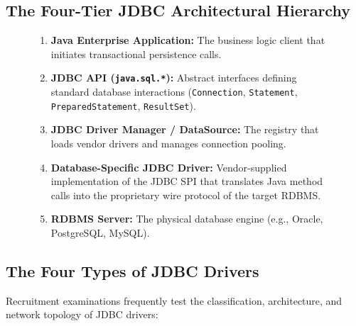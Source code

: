 \subsection{The Four-Tier JDBC Architectural Hierarchy}
\begin{figure}[htbp]
\centering
\begin{tcolorbox}[colback=codebg, colframe=primary, title=\textbf{The Canonical JDBC Component Hierarchy}]
\begin{enumerate}
    \item \textbf{Java Enterprise Application:} The business logic client that initiates transactional persistence calls.
    \item \textbf{JDBC API (\texttt{java.sql.*}):} Abstract interfaces defining standard database interactions (\texttt{Connection}, \texttt{Statement}, \texttt{PreparedStatement}, \texttt{ResultSet}).
    \item \textbf{JDBC Driver Manager / DataSource:} The registry that loads vendor drivers and manages connection pooling.
    \item \textbf{Database-Specific JDBC Driver:} Vendor-supplied implementation of the JDBC SPI that translates Java method calls into the proprietary wire protocol of the target RDBMS.
    \item \textbf{RDBMS Server:} The physical database engine (e.g., Oracle, PostgreSQL, MySQL).
\end{enumerate}
\end{tcolorbox}
\end{figure}

\subsection{The Four Types of JDBC Drivers}
Recruitment examinations frequently test the classification, architecture, and network topology of JDBC drivers:

